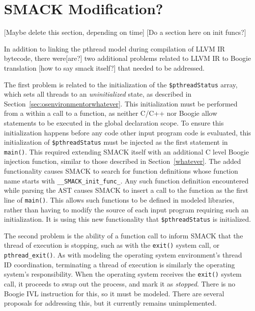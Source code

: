 \section{SMACK Modification?}
[Maybe delete this section, depending on time]
[Do a section here on init funcs?]

In addition to linking the pthread model during compilation of LLVM IR
bytecode, there were[are?] two additional problems related to LLVM IR
to Boogie translation [how to say smack itself?] that needed to be
addressed.

The first problem is related to the initialization of the
\lstinline|$pthreadStatus| array, which sets all threads to an
\emph{uninitialized} state, as described in
Section~\ref{sec:osenvironmentorwhatever}.  This initialization must
be performed from a within a call to a function, as neither C/C++ nor
Boogie allow statements to be executed in the global declaration
scope.  To ensure this initialization happens before any code other
input program code is evaluated, this initialization of
\lstinline|$pthreadStatus| must be injected as the first statement in
\lstinline|main()|.  This required extending SMACK itself with an
additional C level Boogie injection function, similar to those
described in Section~\ref{whatever}.  The added functionality causes
SMACK to search for function definitions whose function name starts
with \lstinline|__SMACK_init_func_|.  Any such function definition
encountered while parsing the AST causes SMACK to insert a call to the
function as the first line of \lstinline|main()|.  This allows such
functions to be defined in modeled libraries, rather than having to
modify the source of each input program requiring such an
initialization.  It is using this new functionality that
\lstinline|$pthreadStatus| is initialized.

The second problem is the ability of a function call to inform SMACK
that the thread of execution is stopping, such as with the
\lstinline|exit()| system call, or \lstinline|pthread_exit()|.  As
with modeling the operating system environment's thread ID coordination,
terminating a thread of execution is similarly the operating system's
responsibility.  When the operating system receives the
\lstinline|exit()| system call, it proceeds to swap out the process,
and mark it as \emph{stopped}.  There is no Boogie IVL instruction for
this, so it must be modeled.  There are several proposals for
addressing this, but it currently remains unimplemented.

